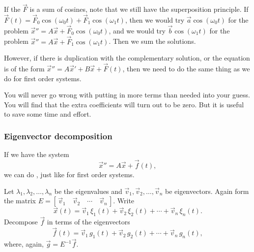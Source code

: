 If the $\vec{F}$ is a sum of
cosines, note that we still have the superposition principle.
If $\vec{F}(t) =
\vec{F}_0 \cos (\omega_0 t) + 
\vec{F}_1 \cos (\omega_1 t)$, then we would try
$\vec{a} \cos (\omega_0 t)$ for the problem
${\vec{x}}'' = A \vec{x} + \vec{F}_0 \cos (\omega_0 t)$, and we would try
$\vec{b} \cos (\omega_1 t)$ for the problem
${\vec{x}}'' = A \vec{x} + \vec{F}_1 \cos (\omega_1 t)$.  Then we sum the
solutions.

However, if there is duplication with the
complementary solution, or the equation is of the form
${\vec{x}}'' = A{\vec{x}}'+ B \vec{x} + \vec{F}(t)$, then we need
to do the same thing as we do for first order systems.

You will never go wrong with putting in more terms than needed into
your guess.  You will find that the extra coefficients will turn out to
be zero.  But it is useful to save some time and effort.

\subsubsection{Eigenvector decomposition}

If we have the system
\begin{equation*}
{\vec{x}}'' = A \vec{x} + \vec{f}(t) ,
\end{equation*}
we can do \emph{}, just like for first
order systems.

Let $\lambda_1, \lambda_2, \ldots, \lambda_n$ be the eigenvalues
and $\vec{v}_1, \vec{v}_2, \ldots, \vec{v}_n$ be eigenvectors.
Again form the matrix %
$E = [\, \vec{v}_1 \quad \vec{v}_2 \quad \cdots \quad \vec{v}_n \,]$.
Write
\begin{equation*}
\vec{x}(t) =
\vec{v}_1 \, \xi_1(t) + 
\vec{v}_2 \, \xi_2(t) + \cdots +
\vec{v}_n \, \xi_n(t) .
\end{equation*}
Decompose $\vec{f}$ in terms of the eigenvectors
\begin{equation*}
\vec{f}(t) =
\vec{v}_1 \, g_1(t) + 
\vec{v}_2 \, g_2(t) + \cdots +
\vec{v}_n \, g_n(t) ,
\end{equation*}
where, again, $\vec{g} = E^{-1} \vec{f}$.

